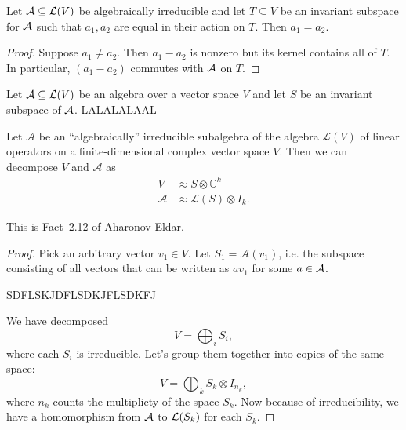 \pagebreak


\begin{claim}
    Let $\mathcal{A} \subseteq \mathcal{L}(V)$ be algebraically irreducible and let $T \subseteq V $ be an invariant subspace for $\mathcal{A}$ such that $a_1, a_2$ are equal in their action on $T$. Then $a_1 = a_2$.
\end{claim}
\begin{proof}
    Suppose $a_1 \neq a_2$. Then $a_1 - a_2$ is nonzero but its kernel contains all of $T$. In particular, $(a_1 - a_2)$ commutes with $\mathcal{A}$ on $T$. 
\end{proof}

\begin{claim}
    Let $\mathcal{A} \subseteq \mathcal{L}(V)$ be an algebra over a vector space $V$ and let $S$ be an invariant subspace of $\mathcal{A}$. LALALALAAL
\end{claim}

\begin{lemma}
    Let $\mathcal{A}$ be an ``algebraically'' irreducible subalgebra of the algebra $\mathcal{L}(V)$ of linear operators on a finite-dimensional complex vector space $V$. Then we can decompose $V$ and $\mathcal{A}$ as
    \begin{align} 
    V &\approx S \otimes \mathbb{C}^k \\
    \mathcal{A} &\approx \mathcal{L}(S) \otimes I_k.
    \end{align}
\end{lemma}
This is Fact~2.12 of Aharonov-Eldar.
\begin{proof}
    Pick an arbitrary vector $v_1 \in V$. Let $S_1 = \mathcal{A}(v_1)$, i.e. the subspace consisting of all vectors that can be written as $a v_1$ for some $a \in \mathcal{A}$. 

    SDFLSKJDFLSDKJFLSDKFJ

    We have decomposed 
    \[ V = \bigoplus_i S_i,\]
    where each $S_i$ is irreducible. Let's group them together into copies of the same space:
    \[V = \bigoplus_k S_k \otimes I_{n_k}, \]
    where $n_k$ counts the multiplicty of the space $S_k$.
    Now because of irreducibility, we have a homomorphism from $\mathcal{A}$ to $\mathcal{L}(S_k)$ for each $S_k$. 
\end{proof}
\newpage

